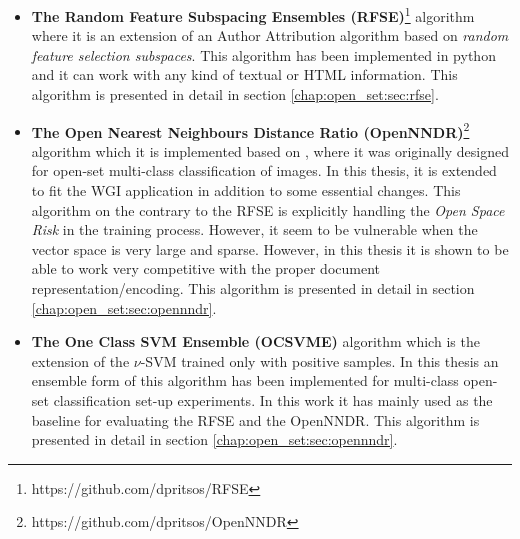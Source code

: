 \begin{enumerate}
\begin{itemize}
\item \textbf{The Random Feature Subspacing Ensembles (RFSE)}\footnote{https://github.com/dpritsos/RFSE} algorithm where it is an extension of an Author Attribution algorithm based on \textit{random feature selection subspaces}. This algorithm has been implemented in python and it can work with any kind of textual or HTML information. This algorithm is presented in detail in section \ref{chap:open_set:sec:rfse}.
\item \textbf{The Open Nearest Neighbours Distance Ratio (OpenNNDR)}\footnote{https://github.com/dpritsos/OpenNNDR} algorithm which it is implemented based on \parencite{mendesjunior2016}, where it was originally designed for open-set multi-class classification of images. In this thesis, it is  extended to fit the WGI application in addition to some essential changes. This algorithm on the contrary to the RFSE is explicitly handling the \textit{Open Space Risk} in the training process. However, it seem to be vulnerable when the vector space is very large and sparse. However, in this thesis it is shown to be able to work very competitive with the proper document representation/encoding. This algorithm is presented in detail in section \ref{chap:open_set:sec:opennndr}.
\item \textbf{The One Class SVM Ensemble (OCSVME)} algorithm which is the extension of the $\nu$-SVM trained only with positive samples. In this thesis an ensemble form of this algorithm has been implemented for multi-class open-set classification set-up experiments. In this work it has mainly used as the baseline for evaluating the RFSE and the OpenNNDR. This algorithm is presented in detail in section \ref{chap:open_set:sec:opennndr}.
\end{itemize}


\end{enumerate}
